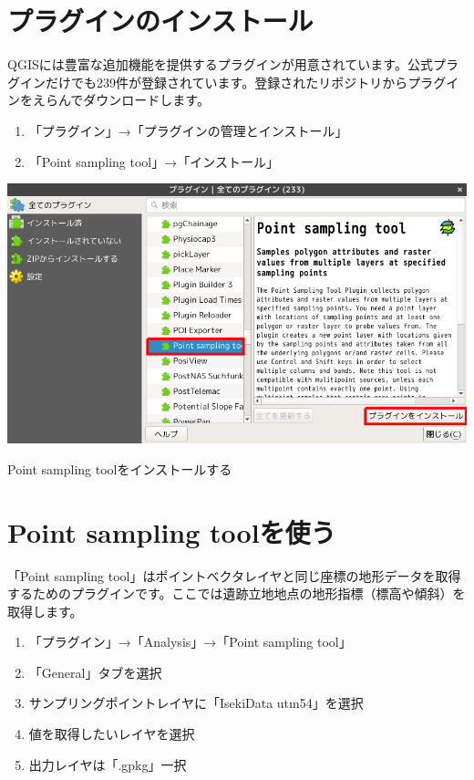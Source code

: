 \documentclass[14Q,twocolumn]{jsarticle}
\makeatletter
\newenvironment{figurehere}
  {\def\@captype{figure}}
  {}
\makeatother
\begin{document}
\section{プラグインのインストール}
QGISには豊富な追加機能を提供するプラグインが用意されています。公式プラグインだけでも239件が登録されています。登録されたリポジトリからプラグインをえらんでダウンロードします。

\begin{enumerate}
\item 「プラグイン」→「プラグインの管理とインストール」
\item 「Point sampling tool」→「インストール」
\end{enumerate}

\begin{figurehere}
\centering
\includegraphics[width=0.8\linewidth]{04.png}
\caption{Point sampling toolをインストールする}
\end{figurehere}

\section{Point sampling toolを使う}
「Point sampling tool」はポイントベクタレイヤと同じ座標の地形データを取得するためのプラグインです。ここでは遺跡立地地点の地形指標（標高や傾斜）を取得します。

\begin{enumerate}
\item 「プラグイン」→「Analysis」→「Point sampling tool」
\item 「General」タブを選択
\item サンプリングポイントレイヤに「IsekiData utm54」を選択
\item 値を取得したいレイヤを選択
\item 出力レイヤは「.gpkg」一択
\end{enumerate}
\end{document}

